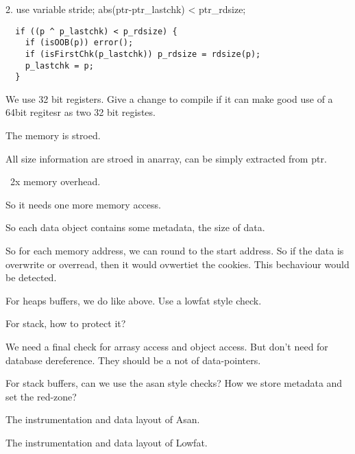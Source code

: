 2. use variable stride;
abs(ptr-ptr_lastchk) < ptr_rdsize;



\begin{verbatim}
  if ((p ^ p_lastchk) < p_rdsize) {
    if (isOOB(p)) error();
    if (isFirstChk(p_lastchk)) p_rdsize = rdsize(p);
    p_lastchk = p;
  }
\end{verbatim}


We use 32 bit registers. Give a change to compile if it can make good use of a 64bit regitesr as two 32 bit registes.

The memory is stroed.


All size information are stroed in anarray, can be simply extracted from ptr.

~2x memory overhead.

So it needs one more memory access.


So each data object contains some metadata, the size of data.

So for each memory address, we can round to the start address.
So if the data is overwrite or overread, then it would ovwertiet the cookies.
This bechaviour would be detected.

For heaps buffers, we do like above. Use a lowfat style check.

For stack, how to protect it?

We need a final check for arrasy access and object access.
But don't need for database dereference.
They should be a not of data-pointers.


For stack buffers, can we use the asan style checks?
How we store metadata and set the red-zone?


The instrumentation and data layout of Asan.

The instrumentation and data layout of Lowfat.


